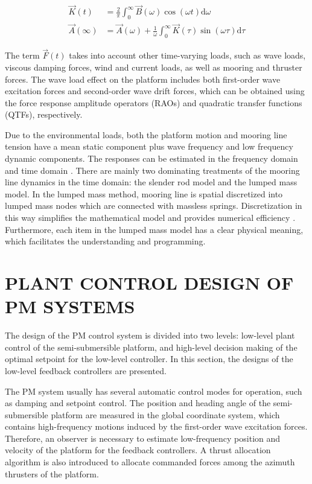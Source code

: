 \begin{sloppypar}
\begin{align}
\vec{K}(t) &= \frac{2}{\pi}\int_{0}^{\infty}\vec{B}(\omega)\cos(\omega t)\mathrm{d}\omega \\
\vec{A}(\infty) &= \vec{A}(\omega) + \frac{1}{\omega}\int_{0}^{\infty}\vec{K}(\tau)\sin(\omega \tau)\mathrm{d}\tau
\end{align}

The term $\vec{F}(t)$ takes into account other time-varying loads, such as wave loads, viscous damping forces, wind and current  loads, as well as mooring and thruster forces. The wave load effect on the platform includes both first-order wave excitation forces and second-order wave drift forces, which can be obtained using the force response amplitude operators (RAOs) and quadratic transfer functions (QTFs), respectively.

Due to the environmental loads, both the platform motion and mooring line tension have a mean static component plus wave frequency and low frequency dynamic components. The responses can be estimated in the frequency domain and time domain \cite{gao2009mooring}. There are mainly two dominating treatments of the mooring line dynamics in the time domain: the slender rod model and the lumped mass model. In the lumped mass method, mooring line is spatial discretized into lumped mass nodes which are connected with massless springs. Discretization in this way simplifies the mathematical model and provides numerical efficiency \cite{chai2002three, low2006time, xiong2016dynamics}. Furthermore, each item in the lumped mass model has a clear physical meaning, which facilitates the understanding and programming.

\section{PLANT CONTROL DESIGN OF PM SYSTEMS}

The design of the PM control system is divided into two levels: low-level plant control of the semi-submersible platform, and high-level decision making of the optimal setpoint for the low-level controller. In this section, the designs of the low-level feedback controllers are presented.

The PM system usually has several automatic control modes for operation, such as damping and setpoint control. The position and heading angle of the semi-submersible platform are measured in the global coordinate system, which contains high-frequency motions induced by the first-order wave excitation forces. Therefore, an observer is necessary to estimate low-frequency position and velocity of the platform for the feedback controllers. A thrust allocation algorithm is also introduced to allocate commanded forces among the azimuth thrusters of the platform.


\end{sloppypar}
